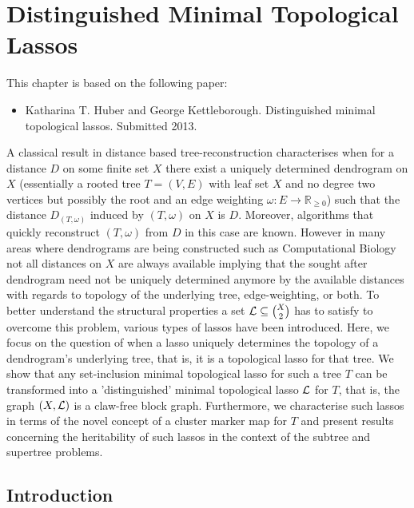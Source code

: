 \chapter{Distinguished Minimal Topological Lassos}
\label{cha:dist-minim-topl}

This chapter is based on the following paper:
\vspace{0.5em}

\noindent

\begin{itemize}
\item Katharina T. Huber and George Kettleborough. Distinguished minimal
  topological lassos.  Submitted 2013.
\end{itemize}

\newpage

A classical result in distance based tree-reconstruction characterises when
for a distance $D$ on some finite set $X$ there exist a uniquely determined
dendrogram on $X$ (essentially a rooted tree $T=(V,E)$ with leaf set $X$ and
no degree two vertices but possibly the root and an edge weighting
$\omega:E\to \mathbb R_{\geq 0}$) such that the distance $D_{(T,\omega)}$
induced by $(T,\omega)$ on $X$ is $D$.  Moreover, algorithms that quickly
reconstruct $(T,\omega)$ from $D$ in this case are known.  However in many
areas where dendrograms are being constructed such as Computational Biology
not all distances on $X$ are always available implying that the sought after
dendrogram need not be uniquely determined anymore by the available distances
with regards to topology of the underlying tree, edge-weighting, or both.  To
better understand the structural properties a set ${\mathcal L}\subseteq {X\choose 2}$
has to satisfy to overcome this problem,
various types of lassos have been introduced.  Here, we focus on the question
of when a lasso uniquely determines the topology of a dendrogram's underlying
tree, that is, it is a topological lasso for that tree.  We show that any
set-inclusion minimal topological lasso for such a tree $T$ can be transformed
into a 'distinguished' minimal topological lasso ${\mathcal L}$ for $T$, that is, the
graph $(X,{\mathcal L})$ is a claw-free block graph. Furthermore, we characterise such
lassos in terms of the novel concept of a cluster marker map for $T$ and
present results concerning the heritability of such lassos in the context of
the subtree and supertree problems.

\section{Introduction}


